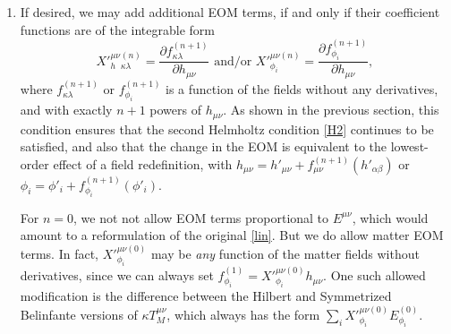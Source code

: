 \documentclass[aps,physrev,preprint,groupedaddress]{revtex4-2}
\begin{document}
\begin{enumerate}
Next, we perform a linear decomposition of the result into terms proportional to the lowest-order EOMs:  
\begin{equation}
    Z^{\mu\nu\rho\sigma(n-1)}=Y_h^{\mu\nu\rho\sigma}{}_{\kappa\lambda}^{(n-1)}E^{\kappa\lambda(0)}+ \sum_i Y_{\phi_i}^{\mu\nu\rho\sigma(n-1)}E_{\phi_i}^{(0)}.
\end{equation}
This is guaranteed to be possible as long as the bootstrap has any valid continuation. The \(Y_h^{\mu\nu\rho\sigma}{}_{\kappa\lambda}^{(n-1)}\) and \(Y_{\phi_i}^{\mu\nu\rho\sigma(n-1)}\) tensors will be functions of the fields without any derivatives, and with exactly \(n-1\) powers of \(h_{\mu\nu}\). 

Now we set 
\begin{equation}
    X_h^{\mu\nu}{}_{\kappa\lambda}^{(n)}=-\frac{1}{2(n+1)}Y_h^{\mu\nu\rho\sigma}{}_{\kappa\lambda}^{(n-1)}h_{\rho\sigma}\text{, and }
X_{\phi_i}^{\mu\nu(n)}=-\frac{1}{2(n+1)}Y_{\phi_i}^{\mu\nu\rho\sigma(n-1)}h_{\rho\sigma}
\end{equation}
for each \(\phi_i\). This gives the EOM terms we must add:
\begin{equation}
E_3^{\mu\nu(n)}=E_2^{\mu\nu(n)}+X_h^{\mu\nu}{}_{\kappa\lambda}^{(n)}E^{\kappa\lambda(0)}+\sum_i X_{\phi_i}^{\mu\nu(n)}E_{\phi_i}^{(0)},
\end{equation}
which will satisfy \eqref{H2}, as shown in the previous section (again assuming that the bootstrap has some valid continuation).

\item If desired, we may add additional EOM terms, if and only if their coefficient functions are of the integrable form
\begin{equation}
X'^{\mu\nu}_h{}_{\kappa\lambda}^{(n)}=\frac{\partial f_{\kappa\lambda}^{(n+1)}}{\partial h_{\mu\nu}}\text{ and/or } X'^{\mu\nu(n)}_{\phi_i}=\frac{\partial f_{\phi_i}^{(n+1)}}{\partial h_{\mu\nu}},
\end{equation}
where \(f_{\kappa\lambda}^{(n+1)}\) or \(f_{\phi_i}^{(n+1)}\) is a function of the fields without any derivatives, and with exactly \(n+1\) powers of \(h_{\mu\nu}\). As shown in the previous section, this condition ensures that the second Helmholtz condition \eqref{H2} continues to be satisfied, and also that the change in the EOM is equivalent to the lowest-order effect of a field redefinition, with \(h_{\mu\nu}=h'_{\mu\nu}+f_{\mu\nu}^{(n+1)}(h'_{\alpha\beta})\) or \(\phi_i=\phi'_i+f_{\phi_i}^{(n+1)}(\phi'_i)\). 

For \(n=0\), we not not allow EOM terms proportional to \(E^{\mu\nu}\), which would amount to a reformulation of the original \eqref{lin}. But we do allow matter EOM terms. In fact, \(X'^{\mu\nu(0)}_{\phi_i}\) may be \textit{any} function of the matter fields without derivatives, since we can always set \(f_{\phi_i}^{(1)}=X'^{\mu\nu(0)}_{\phi_i}h_{\mu\nu}\). One such allowed modification is the difference between the Hilbert and Symmetrized Belinfante versions of \(\kappa T_M^{\mu\nu}\), which always has the form \(\sum_i X'^{\mu\nu(0)}_{\phi_i}E_{\phi_i}^{(0)}\).


\end{enumerate}
\end{document}
